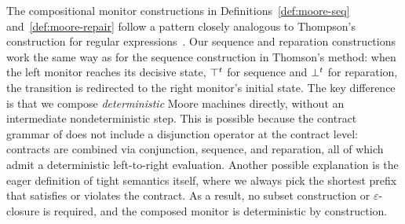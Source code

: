 \begin{remark}
  \label{rem:thompson-analogy}
  The compositional monitor constructions in Definitions~\ref{def:moore-seq} and~\ref{def:moore-repair} follow a pattern closely analogous to Thompson's construction for regular expressions~\cite{Thompson1968}.
Our sequence and reparation constructions work the same way as for the sequence construction in Thomson’s method: when the left monitor reaches its decisive state, $\top^t$ for sequence and $\bot^t$ for reparation, the transition is redirected to the right monitor's initial state.
  The key difference is that we compose \emph{deterministic} Moore machines directly, without an intermediate nondeterministic step.
  This is possible because the contract grammar of \cDL does not include a disjunction operator at the contract level: contracts are combined via conjunction, sequence, and reparation, all of which admit a deterministic left-to-right evaluation. Another possible explanation is the eager definition of tight semantics itself, where we always pick the shortest prefix that satisfies or violates the contract.
  As a result, no subset construction or $\varepsilon$-closure is required, and the composed monitor is deterministic by construction.

  \end{remark}



